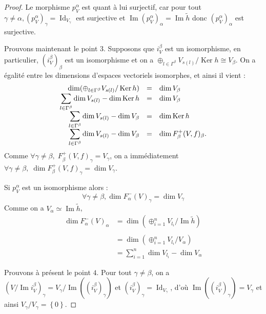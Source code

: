 \documentclass[a4paper,11pt]{article}
\DeclareMathOperator{\Ker}{Ker}
\DeclareMathOperator{\Id}{Id}
\DeclareMathOperator{\Img}{Im}
\newcommand{\dps}{\displaystyle}
\begin{document}
\begin{proof}
Le morphisme $p_{V}^{\alpha}$ est quant à lui surjectif, car pour tout $\gamma \neq \alpha, (p_{V}^{\alpha})_{\gamma} = \Id_{V_{\gamma}}$ est surjective et $ \Img (p_{V}^{\alpha})_{\alpha} = \Img \widetilde{h}$ donc $ (p_{V}^{\alpha})_{\alpha}$ est surjective.  

	Prouvons maintenant le point $3$. Supposons que $i_{V}^{\beta}$ est un isomorphisme, en particulier, $(i_{V}^{\beta})_{\beta}$ est un isomorphisme et on a $\oplus_{l\in\Gamma^{\beta}}V_{s(l)}/\Ker h\cong V_{\beta}$. On a égalité entre les dimensions d'espaces vectoriels isomorphes, et ainsi il vient :
	\[
\begin{array}{>{\dps}r>{\dps}l>{\dps}l}
	\dim(\oplus_{l\in\Gamma^{\beta}}V_{s(l)}/\Ker h) &=& \dim V_{\beta}\\
	\sum_{l\in\Gamma^{\beta}}\dim V_{s(l)}-\dim\Ker h &=& \dim V_{\beta}\\
	\sum_{l\in\Gamma^{\beta}}\dim V_{s(l)}-\dim V_{\beta} &=& \dim\Ker h\\
	\sum_{l\in\Gamma^{\beta}}\dim V_{s(l)}-\dim V_{\beta} &=& \dim F_{\beta}^{+}(V,f)_{\beta}.\\
\end{array}
	\]
	Comme $\forall \gamma\neq\beta,\;F_{\beta}^{+}(V,f)_{\gamma}=V_{\gamma}$, on a immédiatement $\forall \gamma\neq\beta,\;\dim F_{\beta}^{+}(V,f)_{\gamma}=\dim V_{\gamma}$.

        Si $p_{V}^{\alpha}$ est un isomorphisme alors : 
        \[
        \forall \gamma \neq \beta, \dim F_{\alpha}^{-}(V)_{\gamma} = \dim V_{\gamma}
        \]
        Comme on a $V_{\alpha} \simeq \Img \widetilde{h}$,
        \[
        \begin{array}{rl}
        \dim F_{\alpha}^{-}(V)_{\alpha} &= \dim\left( \oplus_{i=1}^{n} V_{l_{i}} / \Img \widetilde{h} \right) \\ \\
                                        &= \dim\left( \oplus_{i=1}^{n} V_{l_{i}} / V_{\alpha} \right) \\
                                        &= \sum_{i=1}^{n} \dim V_{l_{i}} - \dim V_{\alpha}
\end{array}
        \]


	Prouvons à présent le point $4$. Pour tout $\gamma\neq\beta$, on a $(V/\Img i_{V}^{\beta})_{\gamma}=V_{\gamma}/\Img((i_{V}^{\beta})_{\gamma})$ et $(i_{V}^{\beta})_{\gamma}=\Id_{V_{\gamma}}$, d'où $\Img((i_{V}^{\beta})_{\gamma})=V_{\gamma}$ et ainsi $V_{\gamma}/V_{\gamma}=\left\{ 0 \right\}$.


\end{proof}
\end{document}
